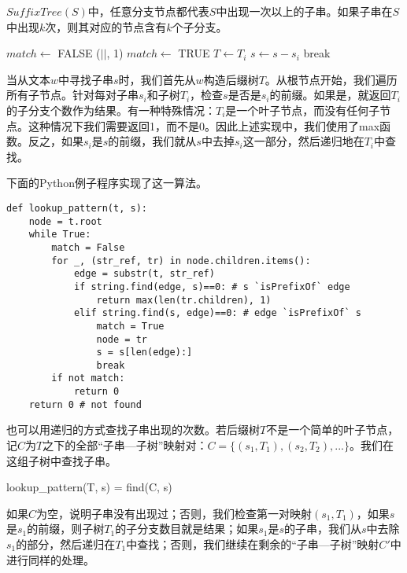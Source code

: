 \documentclass[UTF8]{article}
\begin{document}
$SuffixTree(S)$中，任意分支节点都代表$S$中出现一次以上的子串。如果子串在$S$中出现$k$次，则其对应的节点含有$k$个子分支\cite{ukkonen-lec}。

\begin{algorithmic}[1]
  \Loop
    \State $match \gets$ FALSE
        \State \Return {}($|$$|$, 1)
        \State $match \gets$ TRUE
        \State $T \gets T_i$
        \State $s \gets s - s_i$
        \State break
      \EndIf
    \EndFor
      \State {}
    \EndIf
  \EndLoop
\EndFunction
\end{algorithmic}

当从文本$w$中寻找子串$s$时，我们首先从$w$构造后缀树$T$。从根节点开始，我们遍历所有子节点。针对每对子串$s_i$和子树$T_i$，检查$s$是否是$s_i$的前缀。如果是，就返回$T_i$的子分支个数作为结果。有一种特殊情况：$T_i$是一个叶子节点，而没有任何子节点。这种情况下我们需要返回1，而不是0。因此上述实现中，我们使用了max函数。反之，如果$s_i$是$s$的前缀，我们就从$s$中去掉$s_i$这一部分，然后递归地在$T_i$中查找。

下面的Python例子程序实现了这一算法。

\lstset{language=Python}
\begin{lstlisting}
def lookup_pattern(t, s):
    node = t.root
    while True:
        match = False
        for _, (str_ref, tr) in node.children.items():
            edge = substr(t, str_ref)
            if string.find(edge, s)==0: # s `isPrefixOf` edge
                return max(len(tr.children), 1)
            elif string.find(s, edge)==0: # edge `isPrefixOf` s
                match = True
                node = tr
                s = s[len(edge):]
                break
        if not match:
            return 0
    return 0 # not found
\end{lstlisting}

也可以用递归的方式查找子串出现的次数。若后缀树$T$不是一个简单的叶子节点，记$C$为$T$之下的全部“子串—子树”映射对：$C = \{(s_1, T_1), (s_2, T_2), ...\}$。我们在这组子树中查找子串。

\be
lookup_{pattern}(T, s) = find(C, s)
\ee

如果$C$为空，说明子串没有出现过；否则，我们检查第一对映射$(s_1, T_1)$，如果$s$是$s_1$的前缀，则子树$T_1$的子分支数目就是结果；如果$s_1$是$s$的子串，我们从$s$中去除$s_1$的部分，然后递归在$T_1$中查找；否则，我们继续在剩余的“子串—子树”映射$C'$中进行同样的处理。
\end{document}
